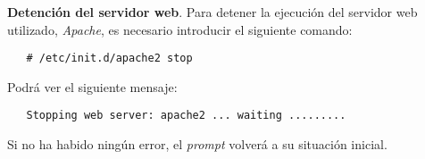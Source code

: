 \item \textbf{Detención del servidor web}.
   Para detener la ejecución del servidor web utilizado, \textit{Apache}, es
   necesario introducir el siguiente comando:

   \begin{verbatim}
   # /etc/init.d/apache2 stop
   \end{verbatim}

   Podrá ver el siguiente mensaje:

   \begin{verbatim}
   Stopping web server: apache2 ... waiting .........
   \end{verbatim}

   Si no ha habido ningún error, el \textit{prompt} volverá a su situación
   inicial.
